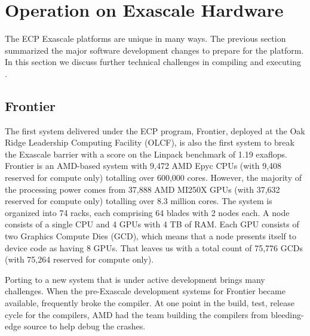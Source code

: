 \section{Operation on Exascale Hardware}

The ECP Exascale platforms are unique in many ways.
The previous section summarized the major software development changes to prepare for the platform.
In this section we discuss further technical challenges in compiling and executing \vtkm.


\subsection{Frontier}
The first system delivered under the ECP program, Frontier, deployed at the Oak Ridge Leadership Computing Facility (OLCF), is also the first system to break the Exascale barrier with a score on the Linpack benchmark of 1.19 exaflops.
Frontier is an AMD-based system with 9,472 AMD Epyc CPUs (with 9,408 reserved for compute only) totalling over 600,000 cores.
However, the majority of the processing power comes from 37,888 AMD MI250X GPUs (with 37,632 reserved for compute only) totalling over 8.3 million cores.
The system is organized into 74 racks, each comprising 64 blades with 2 nodes each.
A node consists of a single CPU and 4 GPUs with 4 TB of RAM.
Each GPU consists of two Graphics Compute Dies (GCD), which means that a node presents itself to device code as having 8 GPUs.
That leaves us with a total count of 75,776 GCDs (with 75,264 reserved for compute only).

Porting to a new system that is under active development brings many challenges.
When the pre-Exascale development systems for Frontier became available, \vtkm frequently broke the compiler.
At one point in the build, test, release cycle for the compilers, AMD had the \vtkm team building the compilers from bleeding-edge source to help debug the crashes.

